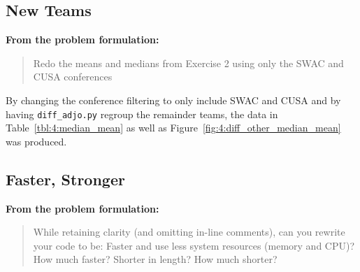 \documentclass[
    12pt,
    a4paper,
    oneside, 
    headinclude,footinclude,
    BCOR5mm,
]{scrartcl}
\newcommand{\cmd}[1]{\texttt{#1}}
\newcommand{\exercisequote}[1]{%
    {\quad\bfseries \small From the problem formulation:}%
    \vspace{-.5em}%
    \begin{quote}\itshape %
        #1 %
    \end{quote}%
}
\begin{document}
\subsection*{New Teams}
\exercisequote{
    Redo the means and medians from Exercise 2 using only the SWAC
    and CUSA conferences
}
By changing the conference filtering to only include SWAC and CUSA
and by having \cmd{diff\_adjo.py} regroup the remainder teams,
the data in Table~\ref{tbl:4:median_mean} as well as Figure~\ref{fig:4:diff_other_median_mean}
was produced.


\subsection*{Faster, Stronger}
\exercisequote{
    While retaining clarity (and omitting in-line comments), can you
    rewrite your code to be: Faster and use less system resources (memory and CPU)? How much faster? Shorter in length? How much shorter?
}



\appendix

\end{document}
